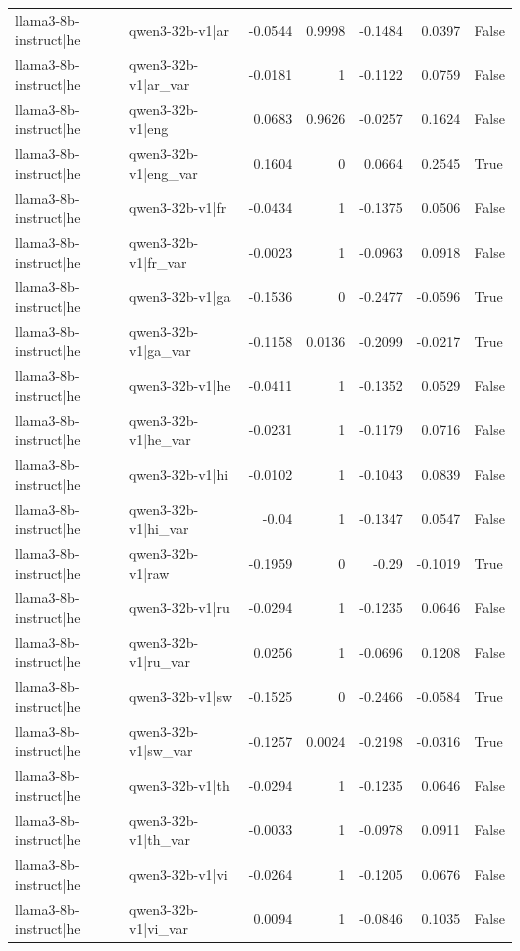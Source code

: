 \begin{table}
\begin{tabular}{l l r r r r l}
llama3-8b-instruct|he & qwen3-32b-v1|ar & -0.0544 & 0.9998 & -0.1484 & 0.0397 & False \\
llama3-8b-instruct|he & qwen3-32b-v1|ar_var & -0.0181 & 1 & -0.1122 & 0.0759 & False \\
llama3-8b-instruct|he & qwen3-32b-v1|eng & 0.0683 & 0.9626 & -0.0257 & 0.1624 & False \\
llama3-8b-instruct|he & qwen3-32b-v1|eng_var & 0.1604 & 0 & 0.0664 & 0.2545 & True \\
llama3-8b-instruct|he & qwen3-32b-v1|fr & -0.0434 & 1 & -0.1375 & 0.0506 & False \\
llama3-8b-instruct|he & qwen3-32b-v1|fr_var & -0.0023 & 1 & -0.0963 & 0.0918 & False \\
llama3-8b-instruct|he & qwen3-32b-v1|ga & -0.1536 & 0 & -0.2477 & -0.0596 & True \\
llama3-8b-instruct|he & qwen3-32b-v1|ga_var & -0.1158 & 0.0136 & -0.2099 & -0.0217 & True \\
llama3-8b-instruct|he & qwen3-32b-v1|he & -0.0411 & 1 & -0.1352 & 0.0529 & False \\
llama3-8b-instruct|he & qwen3-32b-v1|he_var & -0.0231 & 1 & -0.1179 & 0.0716 & False \\
llama3-8b-instruct|he & qwen3-32b-v1|hi & -0.0102 & 1 & -0.1043 & 0.0839 & False \\
llama3-8b-instruct|he & qwen3-32b-v1|hi_var & -0.04 & 1 & -0.1347 & 0.0547 & False \\
llama3-8b-instruct|he & qwen3-32b-v1|raw & -0.1959 & 0 & -0.29 & -0.1019 & True \\
llama3-8b-instruct|he & qwen3-32b-v1|ru & -0.0294 & 1 & -0.1235 & 0.0646 & False \\
llama3-8b-instruct|he & qwen3-32b-v1|ru_var & 0.0256 & 1 & -0.0696 & 0.1208 & False \\
llama3-8b-instruct|he & qwen3-32b-v1|sw & -0.1525 & 0 & -0.2466 & -0.0584 & True \\
llama3-8b-instruct|he & qwen3-32b-v1|sw_var & -0.1257 & 0.0024 & -0.2198 & -0.0316 & True \\
llama3-8b-instruct|he & qwen3-32b-v1|th & -0.0294 & 1 & -0.1235 & 0.0646 & False \\
llama3-8b-instruct|he & qwen3-32b-v1|th_var & -0.0033 & 1 & -0.0978 & 0.0911 & False \\
llama3-8b-instruct|he & qwen3-32b-v1|vi & -0.0264 & 1 & -0.1205 & 0.0676 & False \\
llama3-8b-instruct|he & qwen3-32b-v1|vi_var & 0.0094 & 1 & -0.0846 & 0.1035 & False \\

\end{tabular}
\end{table}
